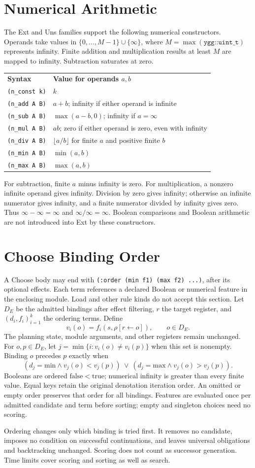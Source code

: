 \documentclass[11pt]{article}
\begin{document}
\section{Numerical Arithmetic}

The Ext and Uns families support the following numerical constructors.
Operands take values in $\{0,\ldots,M-1\}\cup\{\infty\}$, where
$M=\operatorname{max}(\texttt{ygg::uint\_t})$ represents infinity. Finite addition and multiplication results
at least $M$ are mapped to infinity. Subtraction saturates at zero.

\begin{center}
\begin{tabular}{ll}
\textbf{Syntax} & \textbf{Value for operands $a,b$} \\
\texttt{(n\_const k)} & $k$ \\
\texttt{(n\_add A B)} & $a+b$; infinity if either operand is infinite \\
\texttt{(n\_sub A B)} & $\max(a-b,0)$; infinity if $a=\infty$ \\
\texttt{(n\_mul A B)} & $ab$; zero if either operand is zero, even with infinity \\
\texttt{(n\_div A B)} & $\lfloor a/b\rfloor$ for finite $a$ and positive finite $b$ \\
\texttt{(n\_min A B)} & $\min(a,b)$ \\
\texttt{(n\_max A B)} & $\max(a,b)$ \\
\end{tabular}
\end{center}
For subtraction, finite $a$ minus infinity is zero. For multiplication,
a nonzero infinite operand gives infinity. Division by zero gives infinity;
otherwise an infinite numerator gives infinity, and a finite numerator divided
by infinity gives zero. Thus $\infty-\infty=\infty$ and
$\infty/\infty=\infty$. Boolean comparisons and Boolean arithmetic are not
introduced into Ext by these constructors.

\section{Choose Binding Order}

A Choose body may end with
\texttt{(:order (min f1) (max f2) ...)}, after its optional effects.
Each term references a declared Boolean or numerical feature in the enclosing
module. Load and other rule kinds do not accept this section.
Let $D_E$ be the admitted bindings after effect filtering, $r$ the target
register, and $(d_i,f_i)_{i=1}^k$ the ordering terms. Define
\[
 v_i(o)=f_i(s,\rho[r\leftarrow o]),\qquad o\in D_E.
\]
The planning state, module arguments, and other registers remain unchanged.
For $o,p\in D_E$, let $j=\min\{i:v_i(o)\ne v_i(p)\}$ when this set is
nonempty. Binding $o$ precedes $p$ exactly when
\[
 (d_j=\mathrm{min}\land v_j(o)<v_j(p))\ \lor\
 (d_j=\mathrm{max}\land v_j(o)>v_j(p)).
\]
Booleans are ordered $\mathrm{false}<\mathrm{true}$; numerical infinity is
greater than every finite value. Equal keys retain the original denotation
iteration order. An omitted or empty order preserves that order for all
bindings. Features are evaluated once per admitted candidate and term before
sorting; empty and singleton choices need no scoring.

Ordering changes only which binding is tried first. It removes no candidate,
imposes no condition on successful continuations, and leaves universal
obligations and backtracking unchanged. Scoring does not count as successor
generation. Time limits cover scoring and sorting as well as search.
\end{document}

